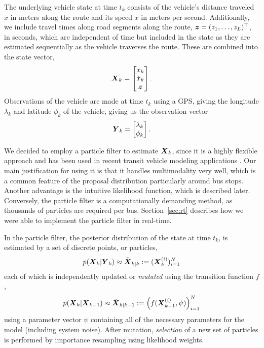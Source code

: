 The underlying vehicle state at time $t_k$ consists of
the vehicle's distance traveled $x$ in meters along the route and
its speed $\dot x$ in meters per second.
Additionally, we include travel times along road segments along the route, 
$\boldsymbol{z} = (z_1,\ldots,z_L)^\top$, in seconds,
which are independent of time but included in the state as they are estimated
sequentially as the vehicle traverses the route.
These are combined into the state vector,
\begin{equation}
\label{eq:vehicle_state}
\mbox{$\boldsymbol{X}$}_k = 
\begin{bmatrix}
    x_k \\ \dot x_k \\ \boldsymbol{z}
\end{bmatrix}.
\end{equation}
Observations of the vehicle are made at time $t_k$ using a GPS,
giving the longitude $\lambda_k$ and latitude $\phi_k$ of the vehicle,
giving us the observation vector
\begin{equation}
\label{eq:vehicle_obs}
\mbox{$\boldsymbol{Y}$}_k = \begin{bmatrix} \lambda_k \\ \phi_k \end{bmatrix}.
\end{equation}


We decided to employ a particle filter to estimate $\mbox{$\boldsymbol{X}$}_k$,
since it is a highly flexible approach and has been used in recent 
transit vehicle modeling applications \citep{Hans_2015}.
Our main justification for using it is that it handles multimodality very well,
which is a common feature of the proposal distribution particularly around bus stops.
Another advantage is the intuitive likelihood function, 
which is described later.
Conversely, the particle filter is a computationally demanding method,
as thousands of particles are required per bus.
Section~\ref{sec:rt} describes how we were able to implement the particle filter in real-time.


In the particle filter, the posterior distribution of the state at time $t_k$,
is estimated by a set of discrete points, or particles,
\begin{equation}
p(\mbox{$\boldsymbol{X}$}_k | \mbox{$\boldsymbol{Y}$}_k) \approx \tilde{\mbox{$\boldsymbol{X}$}}_{k|k} := (\mbox{$\boldsymbol{X}$}_k^{(i)})_{i=1}^N
\end{equation}
each of which is independently updated or \emph{mutated} using the transition function $f$,
\begin{equation}
p(\mbox{$\boldsymbol{X}$}_k | \mbox{$\boldsymbol{X}$}_{k-1}) \approx \tilde{\mbox{$\boldsymbol{X}$}}_{k|k-1} := 
\left(f(\mbox{$\boldsymbol{X}$}_{k-1}^{(i)}, \psi)\right)_{i=1}^N
\end{equation}
using a parameter vector $\psi$ containing all of the necessary parameters
for the model (including system noise).
After mutation, \emph{selection} of a new set of particles is performed by
importance resampling using likelihood weights.


